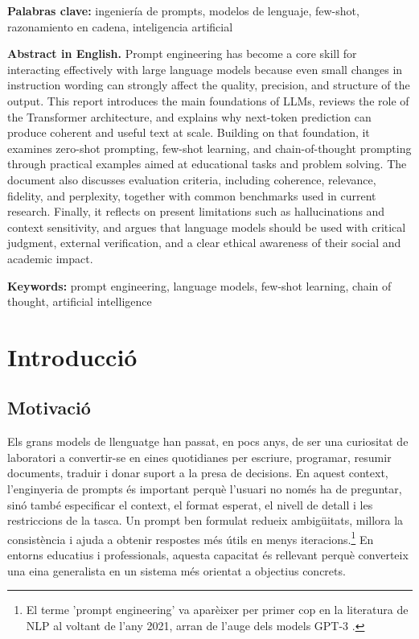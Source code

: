 \documentclass[12pt,a4paper]{report}
\begin{document}
\textbf{Palabras clave:} ingeniería de prompts, modelos de lenguaje, few-shot, razonamiento en cadena, inteligencia artificial

\vspace{1em}
\textbf{Abstract in English.} Prompt engineering has become a core skill for interacting effectively with large language models because even small changes in instruction wording can strongly affect the quality, precision, and structure of the output. This report introduces the main foundations of LLMs, reviews the role of the Transformer architecture, and explains why next-token prediction can produce coherent and useful text at scale. Building on that foundation, it examines zero-shot prompting, few-shot learning, and chain-of-thought prompting through practical examples aimed at educational tasks and problem solving. The document also discusses evaluation criteria, including coherence, relevance, fidelity, and perplexity, together with common benchmarks used in current research. Finally, it reflects on present limitations such as hallucinations and context sensitivity, and argues that language models should be used with critical judgment, external verification, and a clear ethical awareness of their social and academic impact.

\textbf{Keywords:} prompt engineering, language models, few-shot learning, chain of thought, artificial intelligence

\clearpage
\hypersetup{pageanchor=true}
\tableofcontents
\clearpage
\listoftables
\clearpage
\listoffigures
\clearpage
{}

\chapter{Introducció}

\section{Motivació}
Els grans models de llenguatge han passat, en pocs anys, de ser una curiositat de laboratori a convertir-se en eines quotidianes per escriure, programar, resumir documents, traduir i donar suport a la presa de decisions. En aquest context, l'enginyeria de prompts és important perquè l'usuari no només ha de preguntar, sinó també especificar el context, el format esperat, el nivell de detall i les restriccions de la tasca. Un prompt ben formulat redueix ambigüitats, millora la consistència i ajuda a obtenir respostes més útils en menys iteracions.\footnote{El terme 'prompt engineering' va aparèixer per primer cop en la literatura de NLP al voltant de l'any 2021, arran de l'auge dels models GPT-3 \cite{brown2020}.} En entorns educatius i professionals, aquesta capacitat és rellevant perquè converteix una eina generalista en un sistema més orientat a objectius concrets.
\end{document}
